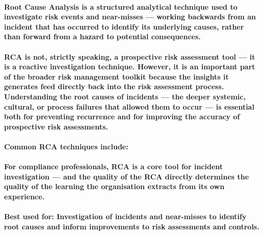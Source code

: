\paragraph{\textbf{Root Cause Analysis} is a structured analytical technique used to investigate risk events and near-misses — working backwards from an incident that has occurred to identify its underlying causes, rather than forward from a hazard to potential consequences.}
\paragraph{RCA is not, strictly speaking, a prospective risk assessment tool — it is a reactive investigation technique. However, it is an important part of the broader risk management toolkit because the insights it generates feed directly back into the risk assessment process. Understanding the root causes of incidents — the deeper systemic, cultural, or process failures that allowed them to occur — is essential both for preventing recurrence and for improving the accuracy of prospective risk assessments.}
\paragraph{Common RCA techniques include:}
\begin{itemize}
\end{itemize}
\paragraph{For compliance professionals, RCA is a core tool for incident investigation — and the quality of the RCA directly determines the quality of the learning the organisation extracts from its own experience.}
\paragraph{\textbf{Best used for}: Investigation of incidents and near-misses to identify root causes and inform improvements to risk assessments and controls.}

